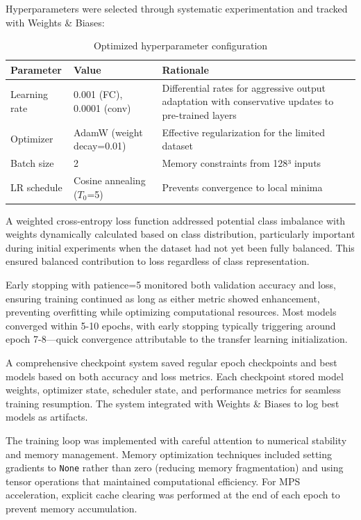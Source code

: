 \documentclass[12pt, a4paper]{article}
\begin{document}
Hyperparameters were selected through systematic experimentation and tracked with Weights \& Biases:

\begin{table}[htbp]
\centering
\begin{tabular}{|l|l|p{5.5cm}|}
\hline
\textbf{Parameter} & \textbf{Value} & \textbf{Rationale} \\
\hline
Learning rate & 0.001 (FC), 0.0001 (conv) & Differential rates for aggressive output adaptation with conservative updates to pre-trained layers \\
\hline
Optimizer & AdamW (weight decay=0.01) & Effective regularization for the limited dataset \\
\hline
Batch size & 2 & Memory constraints from 128³ inputs \\
\hline
LR schedule & Cosine annealing ($T_0$=5) & Prevents convergence to local minima \\
\hline
\end{tabular}
\caption{Optimized hyperparameter configuration}
\end{table}

A weighted cross-entropy loss function addressed potential class imbalance with weights dynamically calculated based on class distribution, particularly important during initial experiments when the dataset had not yet been fully balanced. This ensured balanced contribution to loss regardless of class representation.


Early stopping with patience=5 monitored both validation accuracy and loss, ensuring training continued as long as either metric showed enhancement, preventing overfitting while optimizing computational resources. Most models converged within 5-10 epochs, with early stopping typically triggering around epoch 7-8—quick convergence attributable to the transfer learning initialization.

A comprehensive checkpoint system saved regular epoch checkpoints and best models based on both accuracy and loss metrics. Each checkpoint stored model weights, optimizer state, scheduler state, and performance metrics for seamless training resumption. The system integrated with Weights \& Biases to log best models as artifacts.

The training loop was implemented with careful attention to numerical stability and memory management. Memory optimization techniques included setting gradients to \texttt{None} rather than zero (reducing memory fragmentation) and using tensor operations that maintained computational efficiency. For MPS acceleration, explicit cache clearing was performed at the end of each epoch to prevent memory accumulation.
\end{document}
